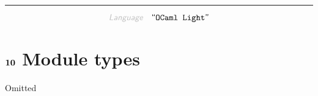 

\begin{center}
\rule{3in}{0.4pt}
\end{center}

\begin{displaymath}
\KEY{Language} \quad \STRING{OCaml Light}
\end{displaymath}

\section{$\SECT{10}$ Module types}\hypertarget{sect10-module-types}{}\label{sect10-module-types}

Omitted



